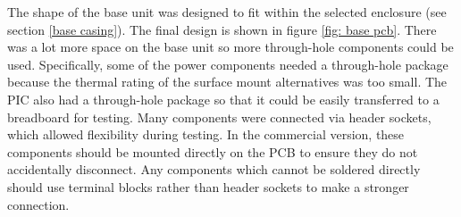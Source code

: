 The shape of the base unit was designed to fit within the selected enclosure (see section \ref{base casing}). The final design is shown in figure \ref{fig: base pcb}. There was a lot more space on the base unit so more through-hole components could be used. Specifically, some of the power components needed a through-hole package because the thermal rating of the surface mount alternatives was too small. The PIC also had a through-hole package so that it could be easily transferred to a breadboard for testing. Many components were connected via header sockets, which allowed flexibility during testing. In the commercial version, these components should be mounted directly on the PCB to ensure they do not accidentally disconnect. Any components which cannot be soldered directly should use terminal blocks rather than header sockets to make a stronger connection. 